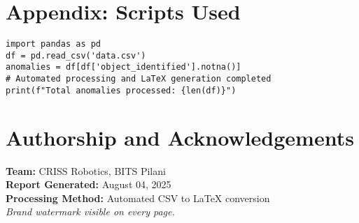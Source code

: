 \documentclass[12pt,a4paper]{report}
\begin{document}
\chapter{Appendix: Scripts Used}
\begin{tcolorbox}[colback=gray!10!white, colframe=gray!80!black, title=Python Processing Script]
\begin{verbatim}
import pandas as pd
df = pd.read_csv('data.csv')
anomalies = df[df['object_identified'].notna()]
# Automated processing and LaTeX generation completed
print(f"Total anomalies processed: {len(df)}")
\end{verbatim}
\end{tcolorbox}

\chapter{Authorship and Acknowledgements}
\noindent\textbf{Team:} CRISS Robotics, BITS Pilani\\
\noindent\textbf{Report Generated:} August 04, 2025\\
\noindent\textbf{Processing Method:} Automated CSV to LaTeX conversion\\

\vspace{0.8cm}
\noindent\textit{Brand watermark visible on every page.}
\end{document}
